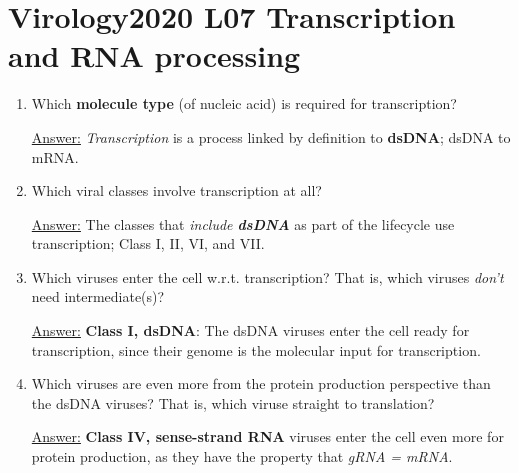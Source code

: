 \documentclass{article}
\newenvironment{QandA}{\begin{enumerate}[label=\bfseries Q\arabic*.]}
                       {\end{enumerate}}
\newenvironment{answered}{\par\normalfont\underline{Answer:}}{}
\begin{document}
\section{Virology2020 L07 Transcription and RNA processing}
\begin{QandA}
  \item{Which \textbf{molecule type} (of nucleic acid) is required for transcription?}
    \begin{answered}
    \textit{Transcription} is a process linked by definition to \textbf{dsDNA}; dsDNA to mRNA.
    \end{answered}
  \item{Which viral classes involve transcription at all?}
    \begin{answered}
    The classes that \textit{include \textbf{dsDNA}} as part of the lifecycle use transcription; Class I, II, VI, and VII.
    \end{answered}
  \item{Which viruses enter the cell  w.r.t. transcription? That is, which viruses \textit{don't} need intermediate(s)?}
    \begin{answered}
    \textbf{Class I, dsDNA}: The dsDNA viruses enter the cell ready for transcription, since their genome is the molecular input for transcription.
    \end{answered}
  \item{Which viruses are even more  from the protein production perspective than the  dsDNA viruses? That is, which viruse  straight to translation?}
    \begin{answered}
    \textbf{Class IV, sense-strand RNA} viruses enter the cell even more  for protein production, as they have the property that \textit{gRNA = mRNA}.
    \end{answered}
\end{QandA}
\end{document}
